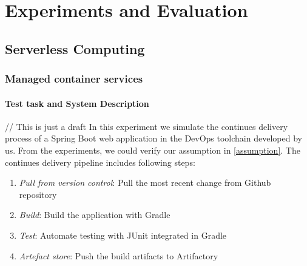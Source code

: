 \chapter{Experiments and Evaluation}
\section{Serverless Computing}
\subsection{Managed container services}
\subsubsection{Test task and System Description}
// This is just a draft
In this experiment we simulate the continues delivery process of a Spring Boot web application in the DevOps toolchain developed by us. From the experiments, we could verify our assumption in \ref{assumption}.
The continues delivery pipeline includes following steps:
\begin{enumerate}
    \item \textit{Pull from version control}: Pull the most recent change from Github repository
    \item \textit{Build}: Build the application with Gradle
    \item \textit{Test}: Automate testing with JUnit integrated in Gradle
    \item \textit{Artefact store}: Push the build artifacts to Artifactory
\end{enumerate}
